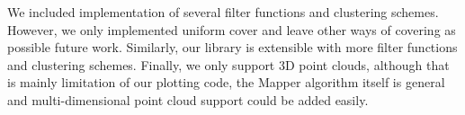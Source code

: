 \documentclass{article}
\begin{document}
We included implementation of several filter functions and clustering schemes.
However, we only implemented uniform cover and leave other ways of covering as
possible future work. Similarly, our library is extensible with more filter
functions and clustering schemes. Finally, we only support 3D point clouds,
although that is mainly limitation of our plotting code, the Mapper algorithm
itself is general and multi-dimensional point cloud support could be added
easily.



\end{document}
